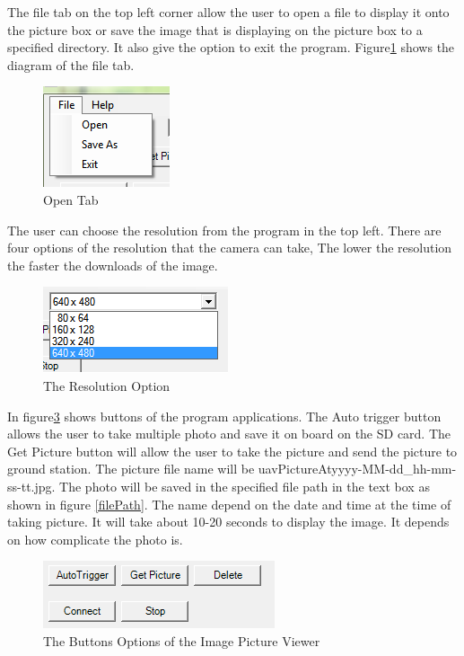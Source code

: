 \documentclass[a4paper,11pt]{article}
\begin{document}
The file tab on the top left corner allow the user to open a file to display it onto the picture box or save the image that is displaying on the picture box to a specified directory. It also give the option to exit the program. Figure\ref{openTab} shows the diagram of the file tab.

\begin{figure}[!htbp]
\begin{center}
\includegraphics[scale=1]{FileButton.png}  
\caption{Open Tab\label{openTab}}
\end{center}
\end{figure}

The user can choose the resolution from the program in the top left. There are four options of the resolution that the camera can take, The lower the resolution the faster the downloads of the image. 

\begin{figure}[!htbp]
\begin{center}
\includegraphics[scale=1]{comboBoxResolution.png}   
\caption{The Resolution Option\label{resOp}}
\end{center}
\end{figure}

In figure\ref{buttons} shows buttons of the program applications. The Auto trigger button allows the user to take multiple photo and save it on board on the SD card. The Get Picture button will allow the user to take the picture and send the picture to ground station. The picture file name will be uavPictureAtyyyy-MM-dd\_hh-mm-ss-tt.jpg. The photo will be saved in the specified file path in the text box as shown in figure \ref{filePath}. The name depend on the date and time at the time of taking picture. It will take about 10-20 seconds to display the image. It depends on how complicate the photo is. 

\begin{figure}[!htbp]
\begin{center}
\includegraphics[scale=1]{button.PNG}  
\caption{The Buttons Options of the Image Picture Viewer\label{buttons}}
\end{center}
\end{figure}
\end{document}
